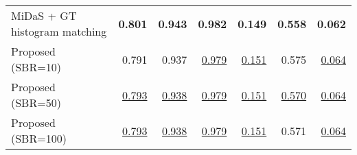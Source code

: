 \begin{tabular}{lrrr|rrr}
\midrule
MiDaS + GT histogram matching      &      \textbf{0.801} &      \textbf{0.943} &      \textbf{0.982} &     \textbf{0.149} &     \textbf{0.558} &     \textbf{0.062} \\
Proposed (SBR=10)                  &               0.791 &               0.937 &   \underline{0.979} &  \underline{0.151} &              0.575 &  \underline{0.064} \\
Proposed (SBR=50)                  &   \underline{0.793} &   \underline{0.938} &   \underline{0.979} &  \underline{0.151} &  \underline{0.570} &  \underline{0.064} \\
Proposed (SBR=100)                 &   \underline{0.793} &   \underline{0.938} &   \underline{0.979} &  \underline{0.151} &              0.571 &  \underline{0.064} \\
\bottomrule
\end{tabular}